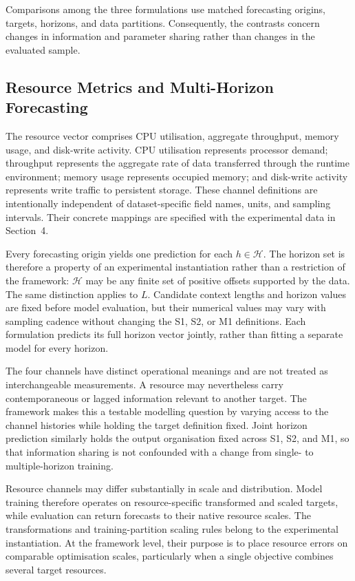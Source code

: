 \documentclass[a4paper,fleqn]{cas-dc}
\begin{document}
Comparisons among the three formulations use matched forecasting origins,
targets, horizons, and data
partitions. Consequently, the contrasts concern changes in information and
parameter sharing rather than changes in the evaluated sample.

\subsection{Resource Metrics and Multi-Horizon Forecasting}
\label{sec:resource-horizons}

The resource vector comprises CPU utilisation, aggregate throughput, memory
usage, and disk-write activity. CPU utilisation represents processor demand;
throughput represents the aggregate rate of data transferred through the
runtime environment; memory usage represents occupied memory; and disk-write
activity represents write traffic to persistent storage. These channel
definitions are intentionally independent of dataset-specific field names,
units, and sampling intervals. Their concrete mappings are specified with the
experimental data in Section~4.

Every forecasting origin yields one prediction for each
$h\in\mathcal{H}$. The horizon set is therefore a property of an experimental
instantiation rather than a restriction of the framework: $\mathcal{H}$ may be
any finite set of positive offsets supported by the data. The same distinction
applies to $L$. Candidate context lengths and horizon values are fixed before
model evaluation, but their numerical values may vary with sampling cadence
without changing the S1, S2, or M1 definitions. Each formulation predicts its
full horizon vector jointly, rather than fitting a separate model for every
horizon.

The four channels have distinct operational meanings and are not treated as
interchangeable measurements. A resource may nevertheless carry
contemporaneous or lagged information relevant to another target. The
framework makes this a testable modelling question by varying access to the
channel histories while holding the target definition fixed. Joint horizon
prediction similarly holds the output organisation fixed across S1, S2, and
M1, so that information sharing is not confounded with a change from single-
to multiple-horizon training.

Resource channels may differ substantially in scale and distribution. Model
training therefore operates on resource-specific transformed and scaled
targets, while evaluation can return forecasts to their native resource
scales. The transformations and training-partition scaling rules belong to the
experimental instantiation. At the framework level, their purpose is to place
resource errors on comparable optimisation scales, particularly when a single
objective combines several target resources.
\end{document}

